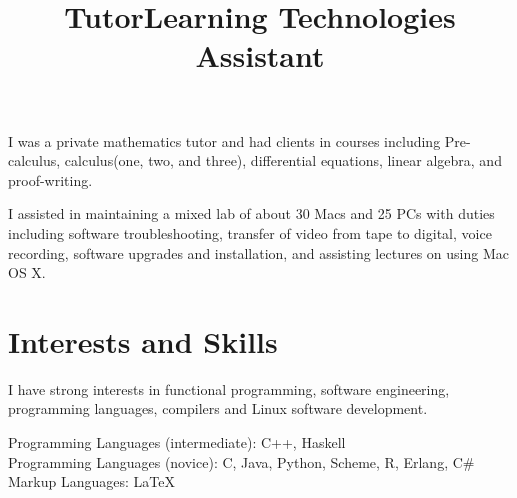\documentclass[margintitle,line]{res}
\renewcommand{\subsection}[1]{\section{\normalfont #1}}
\begin{document}
\begin{resume}
\title{Tutor}
\begin{position}
I was a private mathematics tutor and had clients in courses including Pre-calculus, calculus(one, two, and three), differential equations, linear algebra, and proof-writing.
\end{position}

\title{Learning Technologies Assistant}
\begin{position}
 I assisted in maintaining a mixed lab of about 30 Macs and 25 PCs with duties including software troubleshooting, transfer of video from tape to digital, voice recording, software upgrades and installation, and assisting lectures on using Mac OS X.
\end{position}





\setlength{\parskip}{1ex}





\section{Interests and Skills}

I have strong interests in functional programming, software engineering, programming languages, compilers and Linux software development. 

Programming Languages (intermediate): C++, Haskell \\
Programming Languages (novice): C, Java, Python, Scheme, R, Erlang, C\# \\
Markup Languages: LaTeX \\


\end{resume}
\end{document}
